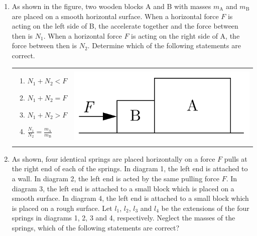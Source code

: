 \documentclass[12pt,letterpaper]{article}
\begin{document}
\begin{enumerate}[resume]
\item
As shown in the figure, two wooden blocks A and B with masses $m_\text{A}$ and $m_\text{B}$ are placed on a smooth horizontal surface. When a horizontal force $F$ is acting on the left side of B, the accelerate together and the force between then is $N_1$. When a horizontal force $F$ is acting on the right side of A, the force between then is $N_2$. Determine which of the following statements are correct.

\begin{tabular}{l r}

\begin{minipage}{0.5\textwidth}
\begin{enumerate}[label=\Roman*.]
\item $N_1+N_2<F$
\item $N_1+N_2=F$
\item $N_1+N_2>F$
\item $\displaystyle \frac{N_1}{N_2}=\frac{m_\text{A}}{m_\text{B}}$
\end{enumerate}
\end{minipage} &
\begin{minipage}{0.4\textwidth}
\includegraphics[width=\textwidth]{blocks.png}
\end{minipage}
\end{tabular}


\vfill
\newpage

\item
As shown, four identical springs are placed horizontally on a force $F$ pulls at the right end of each of the springs. In diagram 1, the left end is attached to a wall. In diagram 2, the left end is acted by the same pulling force $F$. In diagram 3, the left end is attached to a small block which is placed on a smooth surface. In diagram 4, the left end is attached to a small block which is placed on a rough surface. Let $l_1$, $l_2$, $l_3$ and $l_4$ be the extensions of the four springs in diagrams 1, 2, 3 and 4, respectively. Neglect the masses of the springs, which of the following statements are correct?


\end{enumerate}
\end{document}
